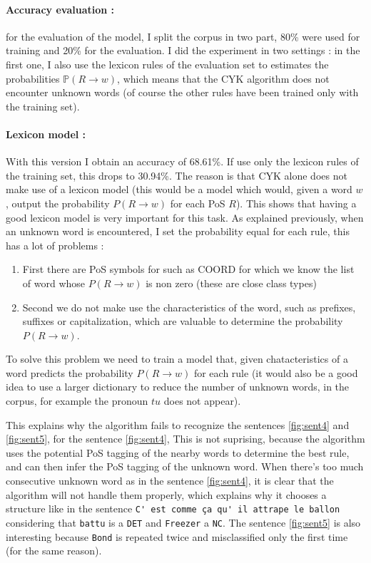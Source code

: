 \documentclass[a4paper, 11pt]{article}
\begin{document}
\paragraph{Accuracy evaluation :}

for the evaluation of the model, I split the corpus in two part, 80\%
were used for training and 20\% for the evaluation. I did the
experiment in two settings : in the first one, I also use the
lexicon rules of the evaluation set to estimates the probabilities
$\mathbb{P}(R \to w)$, which means that the CYK algorithm does not
encounter unknown words (of course the other rules have been trained
only with the training set).

\paragraph{Lexicon model :}

With this version I obtain an accuracy of 68.61\%. If use only the
lexicon rules of the training set, this drops to 30.94\%. The reason
is that CYK alone does not make use of a lexicon model (this would be
a model which would, given a word $w$, output the probability
$P(R \to w)$ for each PoS $R$). This shows that having a good lexicon
model is very important for this task. As explained previously, when
an unknown word is encountered, I set the probability equal for each
rule, this has a lot of problems :
\begin{enumerate}
\item First there are PoS symbols for such as COORD for which we know
  the list of word whose $P(R \to w)$ is non zero (these are close
  class types)
\item Second we do not make use the characteristics of the word,
  such as prefixes, suffixes or capitalization, which are valuable
  to determine the probability $P(R \to w)$.
\end{enumerate}
To solve this problem we need to train a model that, given
chatacteristics of a word predicts the probability $P(R \to w)$ for
each rule (it would also be a good idea to use a larger dictionary to
reduce the number of unknown words, in the corpus, for example the
pronoun $tu$ does not appear).

This explains why the algorithm fails to recognize the sentences
\ref{fig:sent4} and \ref{fig:sent5}, for the sentence \ref{fig:sent4},
This is not suprising, because the algorithm uses the potential PoS
tagging of the nearby words to determine the best rule, and can then
infer the PoS tagging of the unknown word. When there's too much
consecutive unknown word as in the sentence \ref{fig:sent4}, it is
clear that the algorithm will not handle them properly, which explains
why it chooses a structure like in the sentence
\verb+C' est comme ça qu' il attrape le ballon+ considering that
\verb+battu+ is a \verb+DET+ and \verb+Freezer+ a \verb+NC+.  The
sentence \ref{fig:sent5} is also interesting because \verb+Bond+ is
repeated twice and misclassified only the first time (for the same
reason).
\end{document}
